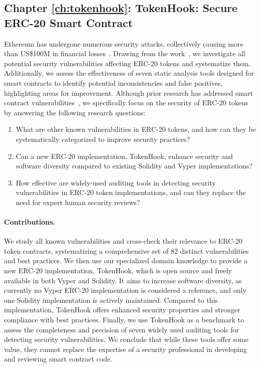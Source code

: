 \subsection*{Chapter \ref{ch:tokenhook}: TokenHook: Secure ERC-20 Smart Contract}
Ethereum has undergone numerous security attacks, collectively causing more than US\$100M in financial losses~\cite{DAO1,PeckShield,PartiyMultiSig,MyEthWallet,ParityFirstHack,ParitySecondHack}. Drawing from the \mwa work~\cite{MultipleWithdrawal}, we investigate all potential security vulnerabilities affecting ERC-20 tokens and systematize them. Additionally, we assess the effectiveness of seven static analysis tools designed for smart contracts to identify potential inconsistencies and false positives, highlighting areas for improvement. Although prior research has addressed smart contract vulnerabilities~\cite{EthSecServ}, we specifically focus on the security of ERC-20 tokens by answering the following research questions:
\begin{enumerate}[label={(RQ6.\arabic*)},leftmargin=*]
	\item What are other known vulnerabilities in ERC-20 tokens, and how can they be systematically categorized to improve security practices?
	\item Can a new ERC-20 implementation, TokenHook, enhance security and software diversity compared to existing Solidity and Vyper implementations?
	\item How effective are widely-used auditing tools in detecting security vulnerabilities in ERC-20 token implementations, and can they replace the need for expert human security reviews?
\end{enumerate}
\paragraph{Contributions.} We study all known vulnerabilities and cross-check their relevance to ERC-20 token contracts, systematizing a comprehensive set of 82 distinct vulnerabilities and best practices. We then use our specialized domain knowledge to provide a new ERC-20 implementation, TokenHook, which is open source and freely available in both Vyper and Solidity. It aims to increase software diversity, as currently no Vyper ERC-20 implementation is considered a reference, and only one Solidity implementation is actively maintained. Compared to this implementation, TokenHook offers enhanced security properties and stronger compliance with best practices. Finally, we use TokenHook as a benchmark to assess the completeness and precision of seven widely used auditing tools for detecting security vulnerabilities. We conclude that while these tools offer some value, they cannot replace the expertise of a security professional in developing and reviewing smart contract code.